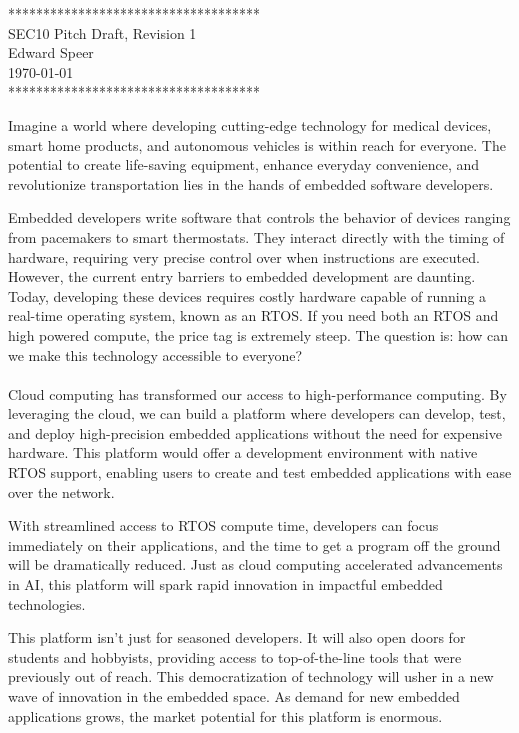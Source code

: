 \documentclass{article}
\newcommand{\HWNUM}{1}
\begin{document}

    \begin{center}
        ************************************ \\
        SEC10 Pitch Draft, Revision \HWNUM \\
        Edward Speer \\
        \today \\
        ************************************
    \end{center}

Imagine a world where developing cutting-edge technology for medical
devices, smart home products, and autonomous vehicles is within reach for
everyone. The potential to create life-saving equipment, enhance everyday
convenience, and revolutionize transportation lies in the hands of embedded
software developers.

Embedded developers write software that controls the behavior of devices 
ranging from pacemakers to smart thermostats. They interact directly with 
the timing of hardware, requiring very precise control over when instructions
are executed. However, the current entry barriers to embedded development are
daunting. Today, developing these devices requires costly hardware capable
of running a real-time operating system, known as an RTOS. If you need both an
RTOS and high powered compute, the price tag is extremely steep. The question
is: how can we make this technology accessible to everyone? \\ \hfill \\

Cloud computing has transformed our access to high-performance computing. By
leveraging the cloud, we can build a platform where developers can develop,
test, and deploy high-precision embedded applications without the need for
expensive hardware. This platform would offer a development environment with
native RTOS support, enabling users to create and test embedded applications
with ease over the network.

With streamlined access to RTOS compute time, developers can focus immediately
on their applications, and the time to get a program off the ground will be 
dramatically reduced. Just as cloud computing accelerated advancements in AI,
this platform will spark rapid innovation in impactful embedded technologies.

This platform isn't just for seasoned developers. It will also open doors for
students and hobbyists, providing access to top-of-the-line tools that were
previously out of reach. This democratization of technology will usher in a
new wave of innovation in the embedded space. As demand for new embedded
applications grows, the market potential for this platform is enormous.
\end{document}
